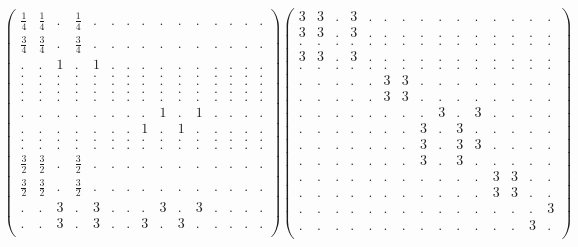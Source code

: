 \documentclass[12pt,a4paper]{amsart}
\begin{document}
\begin{align*}
\left(\begin{array}{rrrrrrrrrrrrrrr}%
\frac14&\frac14&.&\frac14&.&.&.&.&.&.&.&.&.&.&.\\%
\frac34&\frac34&.&\frac34&.&.&.&.&.&.&.&.&.&.&.\\%
.&.&1&.&1&.&.&.&.&.&.&.&.&.&.\\%
.&.&.&.&.&.&.&.&.&.&.&.&.&.&.\\%
.&.&.&.&.&.&.&.&.&.&.&.&.&.&.\\%
.&.&.&.&.&.&.&.&.&.&.&.&.&.&.\\%
.&.&.&.&.&.&.&.&.&.&.&.&.&.&.\\%
.&.&.&.&.&.&.&.&1&.&1&.&.&.&.\\%
.&.&.&.&.&.&.&1&.&1&.&.&.&.&.\\%
.&.&.&.&.&.&.&.&.&.&.&.&.&.&.\\%
.&.&.&.&.&.&.&.&.&.&.&.&.&.&.\\%
\frac32&\frac32&.&\frac32&.&.&.&.&.&.&.&.&.&.&.\\%
\frac32&\frac32&.&\frac32&.&.&.&.&.&.&.&.&.&.&.\\%
.&.&3&.&3&.&.&.&3&.&3&.&.&.&.\\%
.&.&3&.&3&.&.&3&.&3&.&.&.&.&.\\%
\end{array}\right)%
\left(\begin{array}{rrrrrrrrrrrrrrr}%
3&3&.&3&.&.&.&.&.&.&.&.&.&.&.\\%
3&3&.&3&.&.&.&.&.&.&.&.&.&.&.\\%
.&.&.&.&.&.&.&.&.&.&.&.&.&.&.\\%
3&3&.&3&.&.&.&.&.&.&.&.&.&.&.\\%
.&.&.&.&.&.&.&.&.&.&.&.&.&.&.\\%
.&.&.&.&.&3&3&.&.&.&.&.&.&.&.\\%
.&.&.&.&.&3&3&.&.&.&.&.&.&.&.\\%
.&.&.&.&.&.&.&.&3&.&3&.&.&.&.\\%
.&.&.&.&.&.&.&3&.&3&.&.&.&.&.\\%
.&.&.&.&.&.&.&3&.&3&3&.&.&.&.\\%
.&.&.&.&.&.&.&3&.&3&.&.&.&.&.\\%
.&.&.&.&.&.&.&.&.&.&.&3&3&.&.\\%
.&.&.&.&.&.&.&.&.&.&.&3&3&.&.\\%
.&.&.&.&.&.&.&.&.&.&.&.&.&.&3\\%
.&.&.&.&.&.&.&.&.&.&.&.&.&3&.\\%
\end{array}\right)%
\end{align*}
\end{document}
